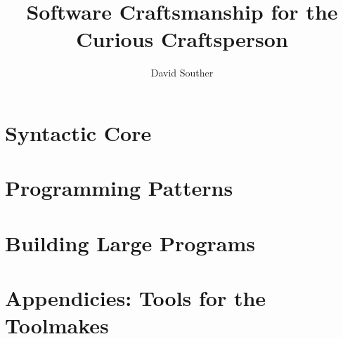 \documentclass{book}
\begin{document}
\setcounter{chapter}{-1}

\title{Software Craftsmanship for the Curious Craftsperson}
\author{David Souther}
\maketitle

\tableofcontents
\newpage




\part{Syntactic Core}





\part{Programming Patterns}






\part{Building Large Programs}





\part{Appendicies: Tools for the Toolmakes}
\appendix



\end{document}
